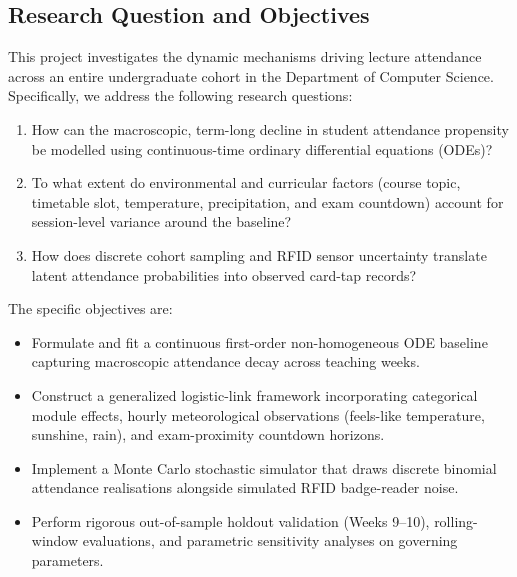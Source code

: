 \documentclass{article}
\begin{document}
\subsection{Research Question and Objectives}
This project investigates the dynamic mechanisms driving lecture attendance across an entire undergraduate cohort in the Department of Computer Science. Specifically, we address the following research questions:
\begin{enumerate}
    \item How can the macroscopic, term-long decline in student attendance propensity be modelled using continuous-time ordinary differential equations (ODEs)?
    \item To what extent do environmental and curricular factors (course topic, timetable slot, temperature, precipitation, and exam countdown) account for session-level variance around the baseline?
    \item How does discrete cohort sampling and RFID sensor uncertainty translate latent attendance probabilities into observed card-tap records?
\end{enumerate}

The specific objectives are:
\begin{itemize}
    \item Formulate and fit a continuous first-order non-homogeneous ODE baseline capturing macroscopic attendance decay across teaching weeks.
    \item Construct a generalized logistic-link framework incorporating categorical module effects, hourly meteorological observations (feels-like temperature, sunshine, rain), and exam-proximity countdown horizons.
    \item Implement a Monte Carlo stochastic simulator that draws discrete binomial attendance realisations alongside simulated RFID badge-reader noise.
    \item Perform rigorous out-of-sample holdout validation (Weeks 9--10), rolling-window evaluations, and parametric sensitivity analyses on governing parameters.
\end{itemize}
\end{document}
